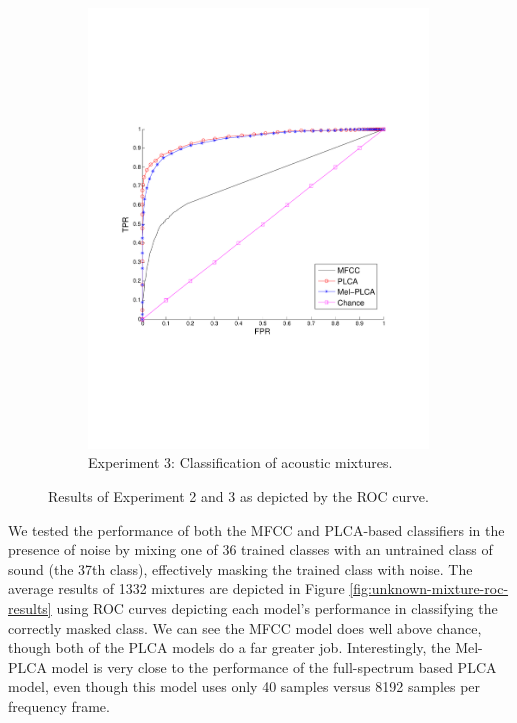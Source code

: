 \documentclass[a4paper,10pt,final]{ThesisStyle}
\begin{document}
\begin{figure}
\begin{subfigure}[b]{0.48\textwidth}
		\includegraphics[width=0.99\textwidth]{images/mixture-roc-results.pdf}
		\caption{Experiment 3: Classification of acoustic mixtures.}
		\label{fig:mixture-roc-results}
	\end{subfigure}
	\caption{Results of Experiment 2 and 3 as depicted by the ROC curve.}
\end{figure}



We tested the performance of both the MFCC and PLCA-based classifiers in the presence of noise by mixing one of 36 trained classes with an untrained class of sound (the 37th class), effectively masking the trained class with noise.  The average results of 1332 mixtures are depicted in Figure \ref{fig:unknown-mixture-roc-results} using ROC curves depicting each model's performance in classifying the correctly masked class.  We can see the MFCC model does well above chance, though both of the PLCA models do a far greater job.  Interestingly, the Mel-PLCA model is very close to the performance of the full-spectrum based PLCA model, even though this model uses only 40 samples versus 8192 samples per frequency frame.
\end{document}
